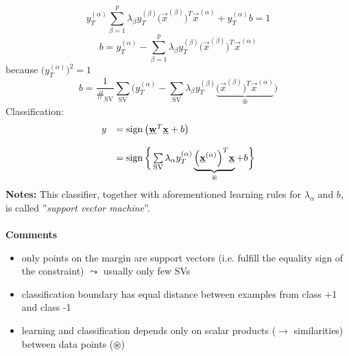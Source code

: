 \begin{equation}
	y_T^{(\alpha)} \sum\limits_{\beta = 1}^p \lambda_\beta 
		y_T^{(\beta)} \Big( \vec{x}^{(\beta)} \Big)^T
		\vec{x}^{(\alpha)} + y_T^{(\alpha)} b = 1
\end{equation}
\begin{equation}
	b = y_T^{(\alpha)} - \sum\limits_{\beta = 1}^p \lambda_\beta
		y_T^{(\beta)} \Big( \vec{x}^{(\beta)} \Big)^T 
		\vec{x}^{(\alpha)} 
\end{equation}
because $\big( y_T^{(\alpha)}\big)^2 = 1 $
\begin{equation} \tag{calculation of $b$}
	b = \frac{1}{\#_{\mathrm{SV}}} \sum\limits_{\mathrm{SV}}
		\bigg( y_T^{(\alpha)} - \sum\limits_{\mathrm{SV}}
			\lambda_\beta y_T^{(\beta)} 
			\underbrace{ \Big( \vec{x}^{(\beta)} \Big)^T 
			\vec{x}^{(\alpha)} }_{ \circledast }
		\bigg)
\end{equation}
Classification:
\begin{equation}
	\begin{array}{ll}
	y 
	& = \operatorname{sign} \big( \underline{\mathbf{w}}^T \underline{\mathbf{x}} + b \big) \\\\
	& = \operatorname{sign} \bigg\{ \sum\limits_{\mathrm{SV}} \lambda_\alpha 
		y_T^{(\alpha)} \underbrace{ \Big( \underline{\mathbf{x}}^{(\alpha)}
			\Big)^T \underline{\mathbf{x}} }_{ \circledast } + b \bigg\}
	\end{array}
\end{equation}
\textbf{Notes:} This classifier, together with aforementioned learning rules for $\lambda_\alpha$ and $b$, is called ''\emph{support vector machine}''.
\\\\
{\bf Comments}
\begin{itemize}
	\item only points on the margin are support vectors (i.e. fulfill 
		the equality sign of the constraint) 
		$\leadsto$ usually only few SVs
	\item classification boundary has equal distance between examples from
		class +1 and class -1
	\item learning and classification depends only on scalar products ($\rightarrow$ similarities) between
		data points ($\circledast$)
\end{itemize}


